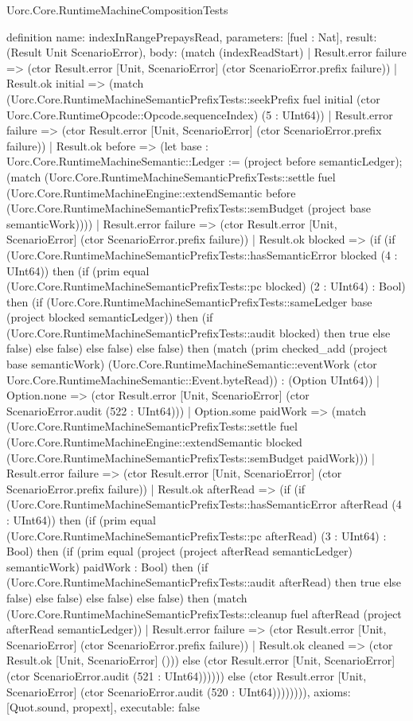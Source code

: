 \begin{lexlean}{Uorc.Core.RuntimeMachineCompositionTests}
\begin{semanticmodule}
definition{
  name: indexInRangePrepaysRead,
  parameters: [fuel : Nat],
  result: (Result Unit ScenarioError),
  body: (match (indexReadStart)
    | Result.error failure => (ctor Result.error [Unit, ScenarioError] (ctor ScenarioError.prefix failure))
    | Result.ok initial => (match (Uorc.Core.RuntimeMachineSemanticPrefixTests::seekPrefix fuel initial (ctor Uorc.Core.RuntimeOpcode::Opcode.sequenceIndex) (5 : UInt64))
      | Result.error failure => (ctor Result.error [Unit, ScenarioError] (ctor ScenarioError.prefix failure))
      | Result.ok before => (let base : Uorc.Core.RuntimeMachineSemantic::Ledger := (project before semanticLedger); (match (Uorc.Core.RuntimeMachineSemanticPrefixTests::settle fuel (Uorc.Core.RuntimeMachineEngine::extendSemantic before (Uorc.Core.RuntimeMachineSemanticPrefixTests::semBudget (project base semanticWork))))
        | Result.error failure => (ctor Result.error [Unit, ScenarioError] (ctor ScenarioError.prefix failure))
        | Result.ok blocked => (if (if (Uorc.Core.RuntimeMachineSemanticPrefixTests::hasSemanticError blocked (4 : UInt64)) then (if (prim equal (Uorc.Core.RuntimeMachineSemanticPrefixTests::pc blocked) (2 : UInt64) : Bool) then (if (Uorc.Core.RuntimeMachineSemanticPrefixTests::sameLedger base (project blocked semanticLedger)) then (if (Uorc.Core.RuntimeMachineSemanticPrefixTests::audit blocked) then true else false) else false) else false) else false) then (match (prim checked_add (project base semanticWork) (Uorc.Core.RuntimeMachineSemantic::eventWork (ctor Uorc.Core.RuntimeMachineSemantic::Event.byteRead)) : (Option UInt64))
          | Option.none => (ctor Result.error [Unit, ScenarioError] (ctor ScenarioError.audit (522 : UInt64)))
          | Option.some paidWork => (match (Uorc.Core.RuntimeMachineSemanticPrefixTests::settle fuel (Uorc.Core.RuntimeMachineEngine::extendSemantic blocked (Uorc.Core.RuntimeMachineSemanticPrefixTests::semBudget paidWork)))
            | Result.error failure => (ctor Result.error [Unit, ScenarioError] (ctor ScenarioError.prefix failure))
            | Result.ok afterRead => (if (if (Uorc.Core.RuntimeMachineSemanticPrefixTests::hasSemanticError afterRead (4 : UInt64)) then (if (prim equal (Uorc.Core.RuntimeMachineSemanticPrefixTests::pc afterRead) (3 : UInt64) : Bool) then (if (prim equal (project (project afterRead semanticLedger) semanticWork) paidWork : Bool) then (if (Uorc.Core.RuntimeMachineSemanticPrefixTests::audit afterRead) then true else false) else false) else false) else false) then (match (Uorc.Core.RuntimeMachineSemanticPrefixTests::cleanup fuel afterRead (project afterRead semanticLedger))
              | Result.error failure => (ctor Result.error [Unit, ScenarioError] (ctor ScenarioError.prefix failure))
              | Result.ok cleaned => (ctor Result.ok [Unit, ScenarioError] ())) else (ctor Result.error [Unit, ScenarioError] (ctor ScenarioError.audit (521 : UInt64)))))) else (ctor Result.error [Unit, ScenarioError] (ctor ScenarioError.audit (520 : UInt64)))))))),
  axioms: [Quot.sound, propext],
  executable: false
}


\end{semanticmodule}
\end{lexlean}
